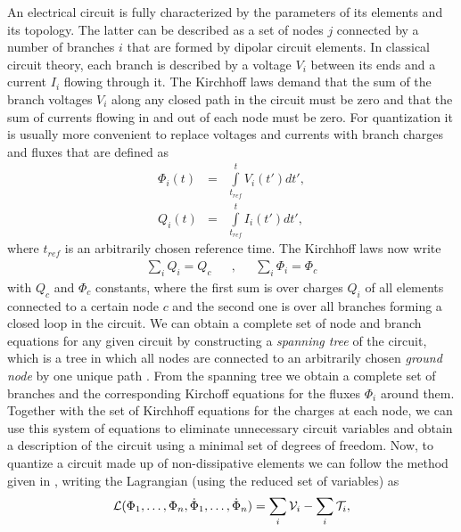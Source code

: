 An electrical circuit is fully characterized by the parameters of its elements and its topology. The latter can be described as a set of nodes $j$ connected by a number of branches $i$ that are formed by dipolar circuit elements. In classical circuit theory, each branch is described by a voltage $V_i$ between its ends and a current $I_{i}$ flowing through it. The Kirchhoff laws demand that the sum of the branch voltages $V_i$ along any closed path in the circuit must be zero and that the sum of currents flowing in and out of each node must be zero. For quantization it is usually more convenient to replace voltages and currents with branch charges and fluxes that are defined as
%
\begin{eqnarray}
\Phi_i(t) & = & \int\limits_{t_{ref}}^t V_i(t') dt',\\
Q_i(t) & = & \int\limits_{t_{ref}}^t I_i(t') dt',
\end{eqnarray}
%
where $t_{ref}$ is an arbitrarily chosen reference time. The Kirchhoff laws now write
%
\begin{align}
\sum\limits_{i} Q_i  =  Q_c & & , & & \sum\limits_{i}\Phi_i = \Phi_c \label{eq:kirchhoff_charge}
\end{align}
%
with $Q_c$ and $\Phi_c$ constants, where the first sum is over charges $Q_i$ of all elements connected to a certain node $c$ and the second one is over all branches forming a closed loop in the circuit. We can obtain a complete set of node and branch equations for any given circuit by constructing a {\it spanning tree} of the circuit, which is a tree in which all nodes are connected to an arbitrarily chosen {\it ground node} by one unique path \citep{devoret_quantum_1995}. From the spanning tree we obtain a complete set of branches and the corresponding Kirchoff equations for the fluxes $\Phi_i$ around them. Together with the set of Kirchhoff equations for the charges at each node, we can use this system of equations to eliminate unnecessary circuit variables and obtain a description of the circuit using a minimal set of degrees of freedom. Now, to quantize a circuit made up of non-dissipative elements we can follow the method given in \cite{yurke_quantum_1984}, writing the Lagrangian (using the reduced set of variables) as 
%
\begin{equation}
\begin{mathcal}L\end{mathcal}(\Phi_1,\hdots,\Phi_n,\dot{\Phi}_1,\hdots,\dot{\Phi}_n) = \sum\limits_i \begin{mathcal}V\end{mathcal}_i - \sum\limits_i \begin{mathcal}T\end{mathcal}_i \label{eq:circuit_lagrangian},
\end{equation}
